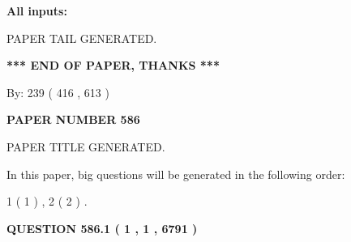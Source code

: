 \documentclass{ctexart}
\begin{document}
   
   
   
\noindent{}
   
   
   
   
\noindent\vspace{0.1in}\hspace{-0.08in} {\textbf{\Large{All inputs: }}}
   
   
   
   
   
   
 \vspace{0.2in}
 
   
   
\vspace{2.0in} PAPER TAIL GENERATED.
   
   
   
   
\vspace{1.0in} 
{\textbf{\large{ *** END OF PAPER, THANKS *** }}} 
   
   
\hspace{1.0in} By: 
 239 ( 416 ,  613 )
   
   
   
   
\newpage 
\setcounter{page}{ 
   586001 } 
   
   
   
   
 {\textbf{ \Large{ PAPER NUMBER  586  }}}
   
   
\vspace{0.2in}
   
   
   
   
   
   
   
   
 \vspace{0.2in}
 
 
 
 
   
   
 PAPER TITLE GENERATED.
   
   
   
\vspace{0.2in}
   
In this paper, big questions will be generated in the following order: 
   
   
   1 ( 1 )
 ,
   2 ( 2 )
 .
  
\vspace{0.2in}
  
{\textbf{\Large{QUESTION
586.1 
 ( 1 , 1 , 6791 )
}}}
  
\end{document}
